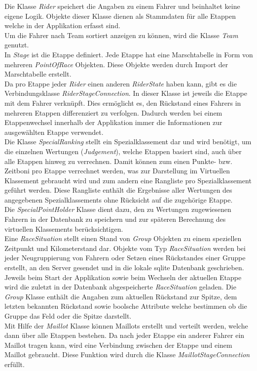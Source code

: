 Die Klasse \textit{Rider} speichert die Angaben zu einem Fahrer und beinhaltet keine eigene Logik. Objekte dieser Klasse dienen als Stammdaten für alle Etappen welche in der Applikation erfasst sind.\\
Um die Fahrer nach Team sortiert anzeigen zu können, wird die Klasse \textit{Team} genutzt.\\
In \textit{Stage} ist die Etappe definiert. Jede Etappe hat eine Marschtabelle in Form von mehreren \textit{PointOfRace} Objekten. Diese Objekte werden durch Import der Marschtabelle erstellt.\\
Da pro Etappe jeder \textit{Rider} einen anderen \textit{RiderState} haben kann, gibt es die Verbindungsklasse \textit{RiderStageConnection}. In dieser Klasse ist jeweils die Etappe mit dem Fahrer verknüpft. Dies ermöglicht es, den Rückstand eines Fahrers in mehreren Etappen differenziert zu verfolgen. Dadurch werden bei einem Etappenwechsel innerhalb der Applikation immer die Informationen zur ausgewählten Etappe verwendet.\\
Die Klasse \textit{SpecialRanking} stellt ein Spezialklassement dar und wird benötigt, um die einzelnen Wertungen (\textit{Judgement}), welche Etappen basiert sind, auch über alle Etappen hinweg zu verrechnen. Damit können zum einen Punkte- bzw. Zeitboni pro Etappe verrechnet werden, was zur Darstellung im Virtuellen Klassement gebraucht wird und zum andern eine Rangliste pro Spezialklassement geführt werden. Diese Rangliste enthält die Ergebnisse aller Wertungen des angegebenen Spezialklassements ohne Rücksicht auf die zugehörige Etappe.\\
Die \textit{SpecialPointHolder} Klasse dient dazu, den zu Wertungen zugewiesenen Fahrern in der Datenbank zu speichern und zur späteren Berechnung des virtuellen Klassements berücksichtigen.\\
Eine \textit{RaceSituation} stellt einen Stand von \textit{Group} Objekten zu einem speziellen Zeitpunkt und Kilometerstand dar. Objekte vom Typ \textit{RaceSituation} werden bei jeder Neugruppierung von Fahrern oder Setzen eines Rückstandes einer Gruppe erstellt, an den Server gesendet und in die lokale \gls{sqlite} Datenbank geschrieben. Jeweils beim Start der Applikation sowie beim Wechseln der aktuellen Etappe wird die zuletzt in der Datenbank abgespeicherte \textit{RaceSituation} geladen. Die \textit{Group} Klasse enthält die Angaben zum aktuellen Rückstand zur Spitze, dem letzten bekannten Rückstand sowie boolsche Attribute welche bestimmen ob die Gruppe das Feld oder die Spitze darstellt.\\
Mit Hilfe der \textit{Maillot} Klasse können Maillots erstellt und verteilt werden, welche dann über alle Etappen bestehen. Da nach jeder Etappe ein anderer Fahrer ein Maillot tragen kann, wird eine Verbindung zwischen der Etappe und einem Maillot gebraucht. Diese Funktion wird durch die Klasse \textit{MaillotStageConnection} erfüllt. 


